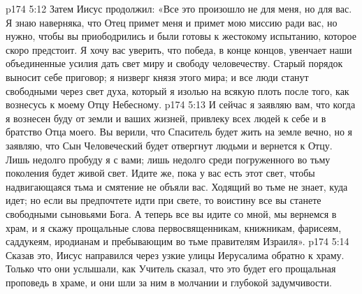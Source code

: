 \vs p174 5:12 Затем Иисус продолжил: «Все это произошло не для меня, но для вас. Я знаю наверняка, что Отец примет меня и примет мою миссию ради вас, но нужно, чтобы вы приободрились и были готовы к жестокому испытанию, которое скоро предстоит. Я хочу вас уверить, что победа, в конце концов, увенчает наши объединенные усилия дать свет миру и свободу человечеству. Старый порядок выносит себе приговор; я низверг князя этого мира; и все люди станут свободными через свет духа, который я изолью на всякую плоть после того, как вознесусь к моему Отцу Небесному.
\vs p174 5:13 И сейчас я заявляю вам, что когда я вознесен буду от земли и ваших жизней, привлеку всех людей к себе и в братство Отца моего. Вы верили, что Спаситель будет жить на земле вечно, но я заявляю, что Сын Человеческий будет отвергнут людьми и вернется к Отцу. Лишь недолго пробуду я с вами; лишь недолго среди погруженного во тьму поколения будет живой свет. Идите же, пока у вас есть этот свет, чтобы надвигающаяся тьма и смятение не объяли вас. Ходящий во тьме не знает, куда идет; но если вы предпочтете идти при свете, то воистину все вы станете свободными сыновьями Бога. А теперь все вы идите со мной, мы вернемся в храм, и я скажу прощальные слова первосвященникам, книжникам, фарисеям, саддукеям, иродианам и пребывающим во тьме правителям Израиля».
\vs p174 5:14 Сказав это, Иисус направился через узкие улицы Иерусалима обратно к храму. Только что они услышали, как Учитель сказал, что это будет его прощальная проповедь в храме, и они шли за ним в молчании и глубокой задумчивости.

